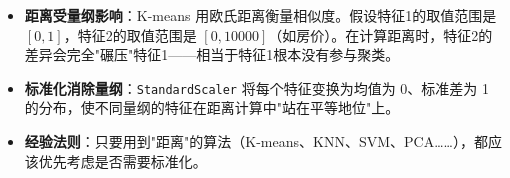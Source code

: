 \documentclass[a4paper,11pt]{ctexart}
\begin{document}
\begin{beginnerbox}
    \begin{itemize}
        \item \textbf{距离受量纲影响}：K-means 用欧氏距离衡量相似度。假设特征1的取值范围是 $[0, 1]$，特征2的取值范围是 $[0, 10000]$（如房价）。在计算距离时，特征2的差异会完全"碾压"特征1——相当于特征1根本没有参与聚类。
        \item \textbf{标准化消除量纲}：\texttt{StandardScaler} 将每个特征变换为均值为 0、标准差为 1 的分布，使不同量纲的特征在距离计算中"站在平等地位"上。
        \item \textbf{经验法则}：只要用到"距离"的算法（K-means、KNN、SVM、PCA……），都应该优先考虑是否需要标准化。
    \end{itemize}
\end{beginnerbox}
\end{document}
